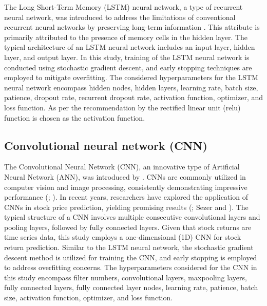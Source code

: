 The Long Short-Term Memory (LSTM) neural network, a type of recurrent neural network, was introduced to address the limitations of conventional recurrent neural networks by preserving long-term information \cite{Graves2005}. This attribute is primarily attributed to the presence of memory cells in the hidden layer. The typical architecture of an LSTM neural network includes an input layer, hidden layer, and output layer. In this study, training of the LSTM neural network is conducted using stochastic gradient descent, and early stopping techniques are employed to mitigate overfitting. The considered hyperparameters for the LSTM neural network encompass hidden nodes, hidden layers, learning rate, batch size, patience, dropout rate, recurrent dropout rate, activation function, optimizer, and loss function. As per the recommendation by \citep{Orimoloye2020} the rectified linear unit (relu) function is chosen as the activation function. %


\subsection{Convolutional neural network (CNN)}

The Convolutional Neural Network (CNN), an innovative type of Artificial Neural Network (ANN), was introduced by \cite{lecun1995convolutional}. CNNs are commonly utilized in computer vision and image processing, consistently demonstrating impressive performance (\cite{ji20123d}; \cite{long2015fully}). In recent years, researchers have explored the application of CNNs in stock price prediction, yielding promising results (\cite{Hoseinzade2019}; Sezer and \cite{Sezer2018}). The typical structure of a CNN involves multiple consecutive convolutional layers and pooling layers, followed by fully connected layers. Given that stock returns are time series data, this study employs a one-dimensional (1D) CNN for stock return prediction. Similar to the LSTM neural network, the stochastic gradient descent method is utilized for training the CNN, and early stopping is employed to address overfitting concerns. The hyperparameters considered for the CNN in this study encompass filter numbers, convolutional layers, maxpooling layers, fully connected layers, fully connected layer nodes, learning rate, patience, batch size, activation function, optimizer, and loss function. %